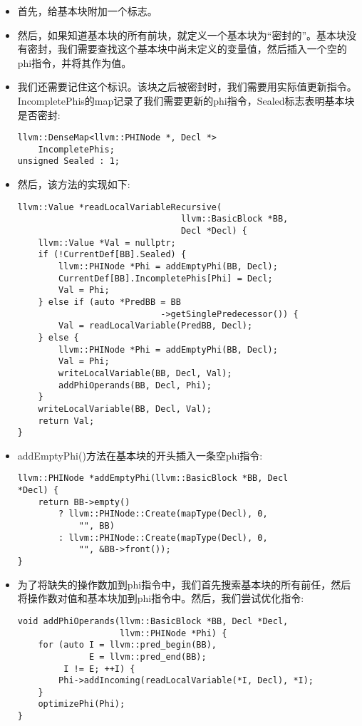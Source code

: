 \begin{itemize}
\item 首先，给基本块附加一个标志。
	
\item 然后，如果知道基本块的所有前块，就定义一个基本块为“密封的”。基本块没有密封，我们需要查找这个基本块中尚未定义的变量值，然后插入一个空的phi指令，并将其作为值。
	
\item 我们还需要记住这个标识。该块之后被密封时，我们需要用实际值更新指令。IncompletePhis的map记录了我们需要更新的phi指令，Sealed标志表明基本块是否密封:
\begin{lstlisting}[caption={}]
llvm::DenseMap<llvm::PHINode *, Decl *>
	IncompletePhis;
unsigned Sealed : 1;
\end{lstlisting}

\item 然后，该方法的实现如下:
\begin{lstlisting}[caption={}]
llvm::Value *readLocalVariableRecursive(
								llvm::BasicBlock *BB,
								Decl *Decl) {
	llvm::Value *Val = nullptr;
	if (!CurrentDef[BB].Sealed) {
		llvm::PHINode *Phi = addEmptyPhi(BB, Decl);
		CurrentDef[BB].IncompletePhis[Phi] = Decl;
		Val = Phi;
	} else if (auto *PredBB = BB
							->getSinglePredecessor()) {
		Val = readLocalVariable(PredBB, Decl);
	} else {
		llvm::PHINode *Phi = addEmptyPhi(BB, Decl);
		Val = Phi;
		writeLocalVariable(BB, Decl, Val);
		addPhiOperands(BB, Decl, Phi);
	}
	writeLocalVariable(BB, Decl, Val);
	return Val;
}
\end{lstlisting}

\item addEmptyPhi()方法在基本块的开头插入一条空phi指令:
\begin{lstlisting}[caption={}]
llvm::PHINode *addEmptyPhi(llvm::BasicBlock *BB, Decl
*Decl) {
	return BB->empty()
		? llvm::PHINode::Create(mapType(Decl), 0,
			"", BB)
		: llvm::PHINode::Create(mapType(Decl), 0,
			"", &BB->front());
}
\end{lstlisting}

\item 为了将缺失的操作数加到phi指令中，我们首先搜索基本块的所有前任，然后将操作数对值和基本块加到phi指令中。然后，我们尝试优化指令:
\begin{lstlisting}[caption={}]
void addPhiOperands(llvm::BasicBlock *BB, Decl *Decl,
					llvm::PHINode *Phi) {
	for (auto I = llvm::pred_begin(BB),
			  E = llvm::pred_end(BB);
		 I != E; ++I) {
		Phi->addIncoming(readLocalVariable(*I, Decl), *I);
	}
	optimizePhi(Phi);
}
\end{lstlisting}

\end{itemize}

